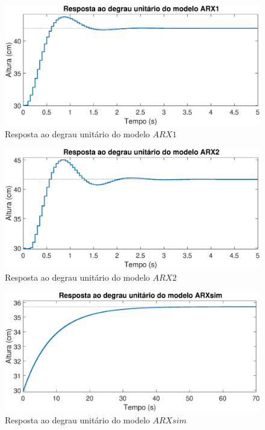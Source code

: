 \begin{figure}[htb]
	\centering
	\includegraphics[width=1\linewidth]{respostadegrauarx1}
	\caption[Resposta ao degrau do modelo $ARX1$]{Resposta ao degrau unitário do modelo $ARX1$}
	\label{fig:respostadegrauarx1}
\end{figure}

\begin{figure}[htb]
	\centering
	\includegraphics[width=1\linewidth]{respostadegrauarx2}
	\caption[Resposta ao degrau do modelo $ARX2$]{Resposta ao degrau unitário do modelo $ARX2$}
	\label{fig:respostadegrauarx2}
\end{figure}

\begin{figure}[htb]
	\centering
	\includegraphics[width=1\linewidth]{respostadegrauarxsim}
	\caption[Resposta ao degrau do modelo $ARXsim$]{Resposta ao degrau unitário do modelo $ARXsim$}
	\label{fig:respostadegrauarxsim}
\end{figure}

